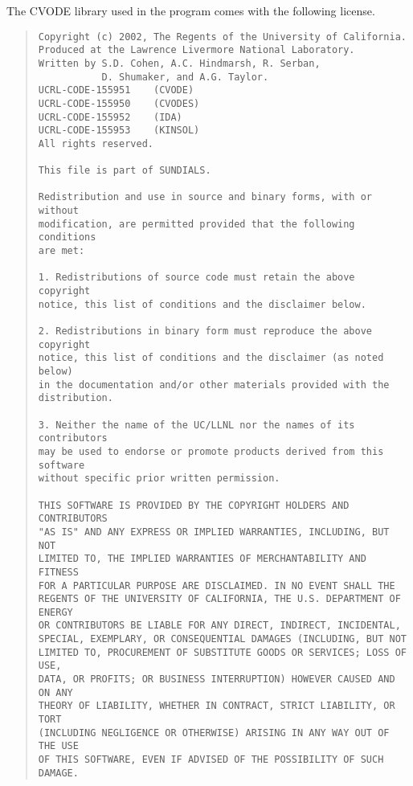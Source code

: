 \documentclass[a4paper,fleqn,11pt]{article}
\numberwithin{equation}{section}
\begin{document}
The CVODE library used in the program comes with the following license.
\begin{quote}
\footnotesize
\begin{verbatim}
Copyright (c) 2002, The Regents of the University of California.
Produced at the Lawrence Livermore National Laboratory.
Written by S.D. Cohen, A.C. Hindmarsh, R. Serban,
           D. Shumaker, and A.G. Taylor.
UCRL-CODE-155951    (CVODE)
UCRL-CODE-155950    (CVODES)
UCRL-CODE-155952    (IDA)
UCRL-CODE-155953    (KINSOL)
All rights reserved.

This file is part of SUNDIALS.

Redistribution and use in source and binary forms, with or without
modification, are permitted provided that the following conditions
are met:

1. Redistributions of source code must retain the above copyright
notice, this list of conditions and the disclaimer below.

2. Redistributions in binary form must reproduce the above copyright
notice, this list of conditions and the disclaimer (as noted below)
in the documentation and/or other materials provided with the
distribution.

3. Neither the name of the UC/LLNL nor the names of its contributors
may be used to endorse or promote products derived from this software
without specific prior written permission.

THIS SOFTWARE IS PROVIDED BY THE COPYRIGHT HOLDERS AND CONTRIBUTORS
"AS IS" AND ANY EXPRESS OR IMPLIED WARRANTIES, INCLUDING, BUT NOT
LIMITED TO, THE IMPLIED WARRANTIES OF MERCHANTABILITY AND FITNESS
FOR A PARTICULAR PURPOSE ARE DISCLAIMED. IN NO EVENT SHALL THE
REGENTS OF THE UNIVERSITY OF CALIFORNIA, THE U.S. DEPARTMENT OF ENERGY
OR CONTRIBUTORS BE LIABLE FOR ANY DIRECT, INDIRECT, INCIDENTAL,
SPECIAL, EXEMPLARY, OR CONSEQUENTIAL DAMAGES (INCLUDING, BUT NOT
LIMITED TO, PROCUREMENT OF SUBSTITUTE GOODS OR SERVICES; LOSS OF USE,
DATA, OR PROFITS; OR BUSINESS INTERRUPTION) HOWEVER CAUSED AND ON ANY
THEORY OF LIABILITY, WHETHER IN CONTRACT, STRICT LIABILITY, OR TORT
(INCLUDING NEGLIGENCE OR OTHERWISE) ARISING IN ANY WAY OUT OF THE USE
OF THIS SOFTWARE, EVEN IF ADVISED OF THE POSSIBILITY OF SUCH DAMAGE.
\end{verbatim}
\end{quote}
\end{document}
